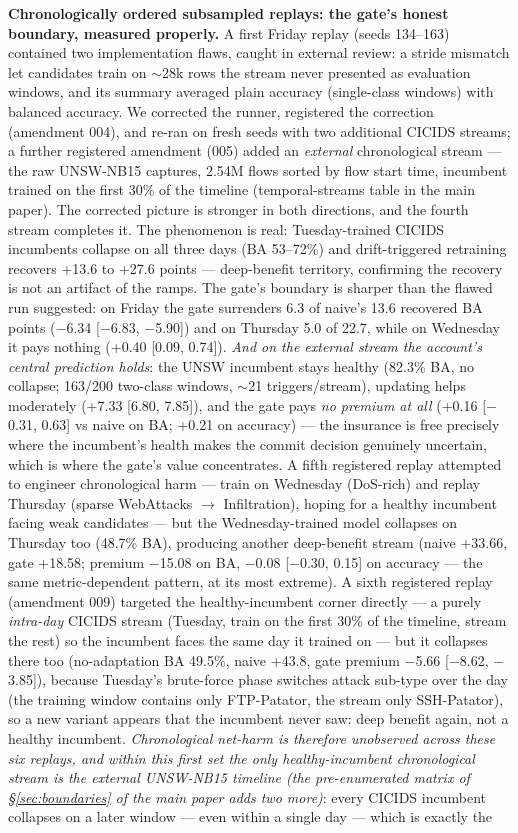 \documentclass[a4paper,11pt]{article}
\begin{document}
\textbf{Chronologically ordered subsampled replays: the gate's honest boundary, measured properly.} A first Friday replay (seeds 134--163) contained two implementation flaws, caught in external review: a stride mismatch let candidates train on ${\sim}$28k rows the stream never presented as evaluation windows, and its summary averaged plain accuracy (single-class windows) with balanced accuracy. We corrected the runner, registered the correction (amendment 004), and re-ran on fresh seeds with two additional CICIDS streams; a further registered amendment (005) added an \emph{external} chronological stream --- the raw UNSW-NB15 captures, 2.54M flows sorted by flow start time, incumbent trained on the first 30\% of the timeline (temporal-streams table in the main paper). The corrected picture is stronger in both directions, and the fourth stream completes it. The phenomenon is real: Tuesday-trained CICIDS incumbents collapse on all three days (BA 53--72\%) and drift-triggered retraining recovers +13.6 to +27.6 points --- deep-benefit territory, confirming the recovery is not an artifact of the ramps. The gate's boundary is sharper than the flawed run suggested: on Friday the gate surrenders 6.3 of naive's 13.6 recovered BA points ($-$6.34 [$-$6.83, $-$5.90]) and on Thursday 5.0 of 22.7, while on Wednesday it pays nothing (+0.40 [0.09, 0.74]). \emph{And on the external stream the account's central prediction holds}: the UNSW incumbent stays healthy (82.3\% BA, no collapse; 163/200 two-class windows, ${\sim}$21 triggers/stream), updating helps moderately (+7.33 [6.80, 7.85]), and the gate pays \emph{no premium at all} (+0.16 [$-$0.31, 0.63] vs naive on BA; +0.21 on accuracy) --- the insurance is free precisely where the incumbent's health makes the commit decision genuinely uncertain, which is where the gate's value concentrates. A fifth registered replay attempted to engineer chronological harm --- train on Wednesday (DoS-rich) and replay Thursday (sparse WebAttacks $\to$ Infiltration), hoping for a healthy incumbent facing weak candidates --- but the Wednesday-trained model collapses on Thursday too (48.7\% BA), producing another deep-benefit stream (naive +33.66, gate +18.58; premium $-$15.08 on BA, $-$0.08 [$-$0.30, 0.15] on accuracy --- the same metric-dependent pattern, at its most extreme). A sixth registered replay (amendment 009) targeted the healthy-incumbent corner directly --- a purely \emph{intra-day} CICIDS stream (Tuesday, train on the first 30\% of the timeline, stream the rest) so the incumbent faces the same day it trained on --- but it collapses there too (no-adaptation BA 49.5\%, naive +43.8, gate premium $-$5.66 [$-$8.62, $-$3.85]), because Tuesday's brute-force phase switches attack sub-type over the day (the training window contains only FTP-Patator, the stream only SSH-Patator), so a new variant appears that the incumbent never saw: deep benefit again, not a healthy incumbent. \emph{Chronological net-harm is therefore unobserved across these six replays, and within this first set the only healthy-incumbent chronological stream is the external UNSW-NB15 timeline (the pre-enumerated matrix of \S\ref{sec:boundaries} of the main paper adds two more)}: every CICIDS incumbent collapses on a later window --- even within a single day --- which is exactly the 
\end{document}
